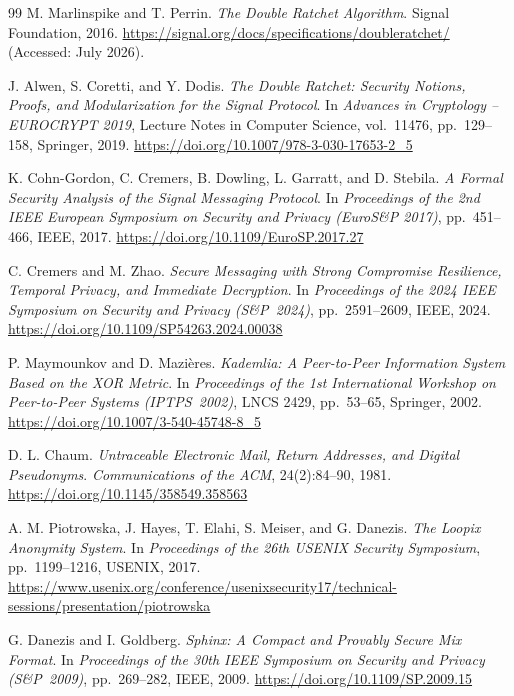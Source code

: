 \documentclass[11pt,a4paper]{article}
\theoremstyle{remark}
\theoremstyle{plain}
\begin{document}
\begin{thebibliography}{99}
M. Marlinspike and T. Perrin.
\emph{The Double Ratchet Algorithm}.
Signal Foundation, 2016.
\url{https://signal.org/docs/specifications/doubleratchet/} (Accessed: July 2026).

J. Alwen, S. Coretti, and Y. Dodis.
\emph{The Double Ratchet: Security Notions, Proofs, and Modularization for the Signal Protocol}.
In \emph{Advances in Cryptology -- EUROCRYPT 2019}, Lecture Notes in Computer Science, vol.~11476, pp.~129--158, Springer, 2019.
\url{https://doi.org/10.1007/978-3-030-17653-2_5}

K. Cohn-Gordon, C. Cremers, B. Dowling, L. Garratt, and D. Stebila.
\emph{A Formal Security Analysis of the Signal Messaging Protocol}.
In \emph{Proceedings of the 2nd IEEE European Symposium on Security and Privacy (EuroS\&P 2017)},
pp.~451--466, IEEE, 2017.
\url{https://doi.org/10.1109/EuroSP.2017.27}

C. Cremers and M. Zhao.
\emph{Secure Messaging with Strong Compromise Resilience, Temporal Privacy, and Immediate Decryption}.
In \emph{Proceedings of the 2024 IEEE Symposium on Security and Privacy (S\&P~2024)},
pp.~2591--2609, IEEE, 2024.
\url{https://doi.org/10.1109/SP54263.2024.00038}

P. Maymounkov and D. Mazi\`eres.
\emph{Kademlia: A Peer-to-Peer Information System Based on the XOR Metric}.
In \emph{Proceedings of the 1st International Workshop on Peer-to-Peer Systems (IPTPS~2002)},
LNCS 2429, pp.~53--65, Springer, 2002.
\url{https://doi.org/10.1007/3-540-45748-8_5}

D. L. Chaum.
\emph{Untraceable Electronic Mail, Return Addresses, and Digital Pseudonyms}.
\emph{Communications of the ACM}, 24(2):84--90, 1981.
\url{https://doi.org/10.1145/358549.358563}

A. M. Piotrowska, J. Hayes, T. Elahi, S. Meiser, and G. Danezis.
\emph{The Loopix Anonymity System}.
In \emph{Proceedings of the 26th USENIX Security Symposium}, pp.~1199--1216, USENIX, 2017.
\url{https://www.usenix.org/conference/usenixsecurity17/technical-sessions/presentation/piotrowska}

G. Danezis and I. Goldberg.
\emph{Sphinx: A Compact and Provably Secure Mix Format}.
In \emph{Proceedings of the 30th IEEE Symposium on Security and Privacy (S\&P~2009)},
pp.~269--282, IEEE, 2009.
\url{https://doi.org/10.1109/SP.2009.15}


\end{thebibliography}
\end{document}
